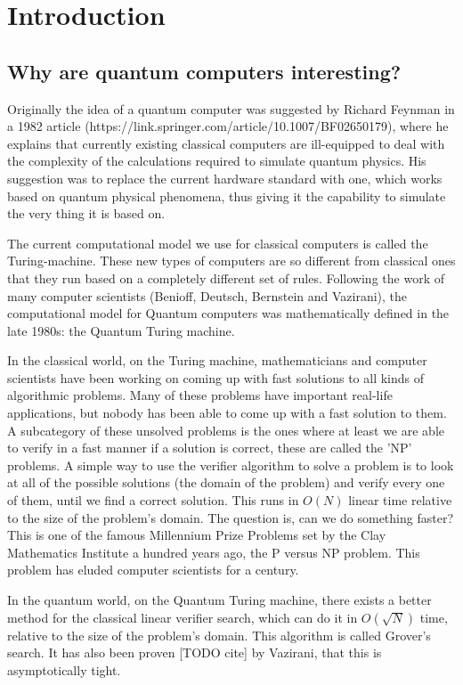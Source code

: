 \chapter{Introduction}

\section{Why are quantum computers interesting?}

Originally the idea of a quantum computer was suggested by Richard Feynman in a 1982 article (https://link.springer.com/article/10.1007/BF02650179), where he explains that currently existing classical computers are ill-equipped to deal with the complexity of the calculations required to simulate quantum physics. His suggestion was to replace the current hardware standard with one, which works based on quantum physical phenomena, thus giving it the capability to simulate the very thing it is based on.

The current computational model we use for classical computers is called the Turing-machine. These new types of computers are so different from classical ones that they run based on a completely different set of rules. Following the work of many computer scientists (Benioff, Deutsch, Bernstein and Vazirani), the computational model for Quantum computers was mathematically defined in the late 1980s: the Quantum Turing machine.

In the classical world, on the Turing machine, mathematicians and computer scientists have been working on coming up with fast solutions to all kinds of algorithmic problems. Many of these problems have important real-life applications, but nobody has been able to come up with a fast solution to them. A subcategory of these unsolved problems is the ones where at least we are able to verify in a fast manner if a solution is correct, these are called the 'NP' problems. A simple way to use the verifier algorithm to solve a problem is to look at all of the possible solutions (the domain of the problem) and verify every one of them, until we find a correct solution. This runs in $O(N)$ linear time relative to the size of the problem's domain. The question is, can we do something faster? This is one of the famous Millennium Prize Problems set by the Clay Mathematics Institute a hundred years ago, the P versus NP problem. This problem has eluded computer scientists for a century.

In the quantum world, on the Quantum Turing machine, there exists a better method for the classical linear verifier search, which can do it in $O(\sqrt{N})$ time, relative to the size of the problem's domain. This algorithm is called Grover's search. It has also been proven [TODO cite] by Vazirani, that this is asymptotically tight.

